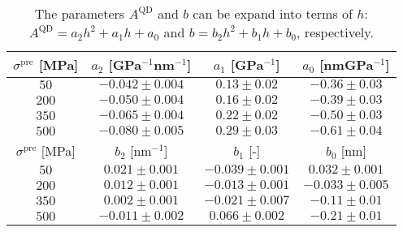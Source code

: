  		\begin{table}[ht!]
 			\centering
 			\caption{The parameters $A^\mathrm{QD}$ and $b$ can be expand into terms of $h$: $A^\mathrm{QD}=a_2h^2+a_1h+a_0$ and $b=b_2h^2 + b_1h+b_0$, respectively.}
 			\label{tab:height_fit}
 			\begin{tabular}{|c|c|c|c|}
 				\hline
 				 $\sigma^\mathrm{pre}$ [MPa]		& $a_2$ [GPa$^{-1}$nm$^{-1}$]    & $a_1$   [GPa$^{-1}$]  &$a_0$ [nmGPa$^{-1}$] \\ \hline
 				$50$  &$-0.042 \pm 0.004$  & $0.13 \pm 0.02$  &  $-0.36 \pm 0.03$ \\ \hline
 				$200$  &$-0.050 \pm 0.004$  & $0.16 \pm 0.02$  &  $-0.39 \pm 0.03$ \\ \hline
 				$350$  &$-0.065 \pm 0.004$  & $0.22 \pm 0.02$  &  $-0.50 \pm 0.03$  \\ \hline
 				 $500$  &$-0.080 \pm 0.005$  & $0.29 \pm 0.03$  &  $-0.61 \pm 0.04$ \\ \hline
 			 				\hline
 			 				$\sigma^\mathrm{pre}$ [MPa]	 & $b_2$ [nm$^{-1}$] & $b_1$ [-] & $b_0$ [nm] \\ \hline
 			 				$50$  &$0.021\pm0.001$ &$-0.039 \pm 0.001$ & $0.032\pm0.001$ \\ \hline
 			 				$200$   & $0.012\pm0.001$ &$-0.013 \pm 0.001$ & $-0.033\pm0.005$ \\ \hline
 			 				$350$  & $0.002\pm0.001$ &$-0.021 \pm 0.007$ & $-0.11\pm0.01$ \\ \hline
 			 				$500$  & $-0.011\pm0.002$ &$0.066 \pm 0.002$ & $-0.21\pm0.01$ \\ \hline
 			 			\end{tabular}   
 		\end{table}
 		

